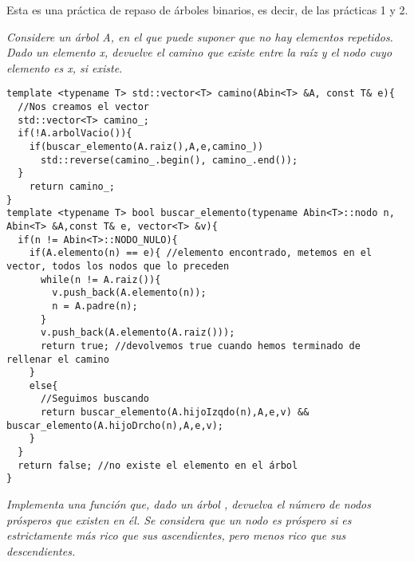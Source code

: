 Esta es una práctica de repaso de árboles binarios, es decir, de las prácticas 1 y 2.

\textbf{\large{}}\textit{ Considere un árbol A, en el que puede suponer que no hay elementos repetidos. Dado un elemento x, devuelve el camino que existe entre la raíz y el nodo cuyo elemento es x, si existe.}

\begin{verbatim}
template <typename T> std::vector<T> camino(Abin<T> &A, const T& e){
  //Nos creamos el vector
  std::vector<T> camino_;
  if(!A.arbolVacio()){
    if(buscar_elemento(A.raiz(),A,e,camino_))
      std::reverse(camino_.begin(), camino_.end());
  }
    return camino_;
}
template <typename T> bool buscar_elemento(typename Abin<T>::nodo n, Abin<T> &A,const T& e, vector<T> &v){
  if(n != Abin<T>::NODO_NULO){
    if(A.elemento(n) == e){ //elemento encontrado, metemos en el vector, todos los nodos que lo preceden
      while(n != A.raiz()){
        v.push_back(A.elemento(n));
        n = A.padre(n);
      }
      v.push_back(A.elemento(A.raiz()));
      return true; //devolvemos true cuando hemos terminado de rellenar el camino
    }
    else{
      //Seguimos buscando
      return buscar_elemento(A.hijoIzqdo(n),A,e,v) && buscar_elemento(A.hijoDrcho(n),A,e,v);
    }
  }
  return false; //no existe el elemento en el árbol
}

\end{verbatim}

\textbf{\large{}}\textit{ Implementa una función que, dado un árbol , devuelva el número de nodos prósperos que existen en él. Se considera que un nodo es próspero si es estrictamente más rico que sus ascendientes, pero menos rico que sus descendientes.}

